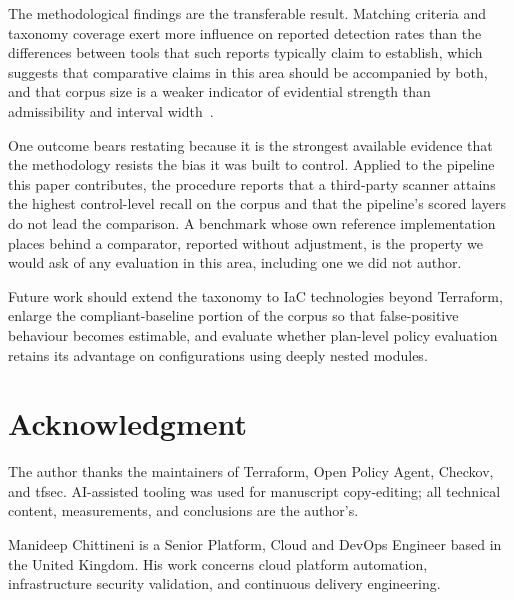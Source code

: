 \documentclass[journal]{IEEEtran}
\begin{document}
The methodological findings are the transferable result. Matching criteria and
taxonomy coverage exert more influence on reported detection rates than the
differences between tools that such reports typically claim to establish, which
suggests that comparative claims in this area should be accompanied by both, and
that corpus size is a weaker indicator of evidential strength than admissibility
and interval width~\cite{bohme2022reliability}.

One outcome bears restating because it is the strongest available evidence that
the methodology resists the bias it was built to control. Applied to the pipeline
this paper contributes, the procedure reports that a third-party scanner attains
the highest control-level recall on the corpus and that the pipeline's scored
layers do not lead the comparison. A benchmark whose own reference implementation
places behind a comparator, reported without adjustment, is the property we would
ask of any evaluation in this area, including one we did not author.

Future work should extend the taxonomy to IaC technologies beyond Terraform,
enlarge the compliant-baseline portion of the corpus so that false-positive
behaviour becomes estimable, and evaluate whether plan-level policy evaluation
retains its advantage on configurations using deeply nested modules.

\section*{Acknowledgment}
The author thanks the maintainers of Terraform, Open Policy Agent, Checkov, and
tfsec. AI-assisted tooling was used for manuscript copy-editing;
all technical content, measurements, and conclusions are the author's.




\begin{IEEEbiographynophoto}{Manideep Chittineni}
is a Senior Platform, Cloud and DevOps Engineer based in the United Kingdom. His
work concerns cloud platform automation, infrastructure security validation, and
continuous delivery engineering.
\end{IEEEbiographynophoto}
\end{document}
